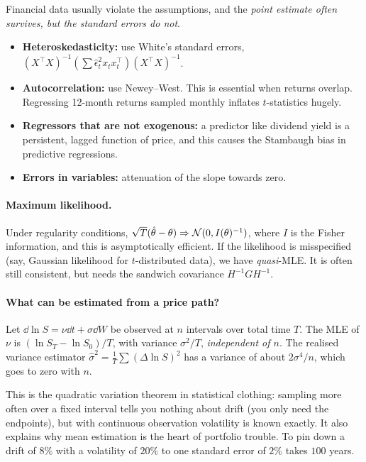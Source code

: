 Financial data usually violate the assumptions, and the \emph{point estimate often survives, but the standard errors do not}.
\begin{itemize}
\item \textbf{Heteroskedasticity:} use White's standard errors, $(X^\top X)^{-1}(\sum\hat\epsilon_t^2x_tx_t^\top)(X^\top X)^{-1}$.
\item \textbf{Autocorrelation:} use Newey--West. This is essential when returns overlap. Regressing 12-month returns sampled monthly inflates $t$-statistics hugely.
\item \textbf{Regressors that are not exogenous:} a predictor like dividend yield is a persistent, lagged function of price, and this causes the Stambaugh bias in predictive regressions.
\item \textbf{Errors in variables:} attenuation of the slope towards zero.
\end{itemize}

\paragraph{Maximum likelihood.} Under regularity conditions, $\sqrt T(\hat\theta-\theta)\Rightarrow\mathcal{N}(0,I(\theta)^{-1})$, where $I$ is the Fisher information, and this is asymptotically efficient. If the likelihood is misspecified (say, Gaussian likelihood for $t$-distributed data), we have \emph{quasi}-MLE. It is often still consistent, but needs the sandwich covariance $H^{-1}GH^{-1}$.

\paragraph{What can be estimated from a price path?}
\begin{proposition}
Let $\dd\ln S=\nu\dd t+\sigma\dd W$ be observed at $n$ intervals over total time $T$. The MLE of $\nu$ is $(\ln S_T-\ln S_0)/T$, with variance $\sigma^2/T$, \emph{independent of $n$}. The realised variance estimator $\hat\sigma^2=\frac1T\sum(\Delta\ln S)^2$ has a variance of about $2\sigma^4/n$, which goes to zero with $n$.
\end{proposition}

\begin{intuition}
This is the quadratic variation theorem in statistical clothing: sampling more often over a fixed interval tells you nothing about drift (you only need the endpoints), but with continuous observation volatility is known exactly. It also explains why mean estimation is the heart of portfolio trouble. To pin down a drift of $8\%$ with a volatility of $20\%$ to one standard error of $2\%$ takes $100$ years.
\end{intuition}

